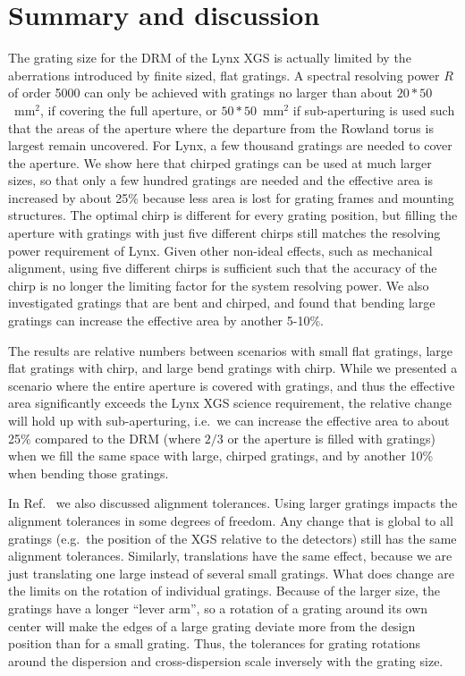 \documentclass[]{spie}  %
\begin{document}
\section{Summary and discussion}
\label{sect:summary}
The grating size for the DRM of the Lynx XGS is actually limited by the aberrations introduced by finite sized, flat gratings. A spectral resolving power $R$ of order 5000 can only be achieved with gratings no larger than about $20 * 50$~mm$^2$, if covering the full aperture, or $50 * 50$~mm$^2$ if sub-aperturing is used such that the areas of the aperture where the departure from the Rowland torus is largest remain uncovered. For Lynx, a few thousand gratings are needed to cover the aperture. We show here that chirped gratings can be used at much larger sizes, so that only a few hundred gratings are needed and the effective area is increased by about 25\% because less area is lost for grating frames and mounting structures. The optimal chirp is different for every grating position, but filling the aperture with gratings with just five different chirps still matches the resolving power requirement of Lynx. Given other non-ideal effects, such as mechanical alignment, using five different chirps is sufficient such that the accuracy of the chirp is no longer the limiting factor for the system resolving power.
We also investigated gratings that are bent and chirped, and found that bending large gratings can increase the effective area by another 5-10\%.

The results are relative numbers between scenarios with small flat gratings, large flat gratings with chirp, and large bend gratings with chirp. While we presented a scenario where the entire aperture is covered with gratings, and thus the effective area significantly exceeds the Lynx XGS science requirement, the relative change will hold up with sub-aperturing, i.e.\ we can increase the effective area to about 25\% compared to the DRM (where $2/3$ or the aperture is filled with gratings) when we fill the same space with large, chirped gratings, and by another 10\% when bending those gratings.

In Ref.~ we also discussed alignment tolerances. Using larger gratings impacts the alignment tolerances in some degrees of freedom. Any change that is global to all gratings (e.g.\ the position of the XGS relative to the detectors) still has the same alignment tolerances. Similarly, translations have the same effect, because we are just translating one large instead of several small gratings. What does change are the limits on the rotation of individual gratings. Because of the larger size, the gratings have a longer ``lever arm'', so a rotation of a grating around its own center will make the edges of a large grating deviate more from the design position than for a small grating. Thus, the tolerances for grating rotations around the dispersion and cross-dispersion scale inversely with the grating size.
\end{document}
